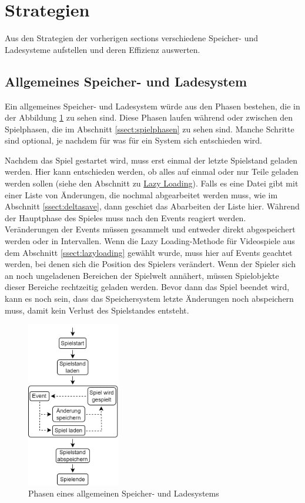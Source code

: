 \section{Strategien}
Aus den Strategien der vorherigen sections verschiedene Speicher- und Ladesysteme aufstellen und deren Effizienz auswerten. 

\subsection{Allgemeines Speicher- und Ladesystem}
Ein allgemeines Speicher- und Ladesystem würde aus den Phasen bestehen, die in der Abbildung \ref{fig:speicherphasen} zu sehen sind. Diese Phasen laufen während oder zwischen den Spielphasen, die im Abschnitt \ref{ssect:spielphasen} zu sehen sind. Manche Schritte sind optional, je nachdem für was für ein System sich entschieden wird.

Nachdem das Spiel gestartet wird, muss erst einmal der letzte Spielstand geladen werden. Hier kann entschieden werden, ob alles auf einmal oder nur Teile geladen werden sollen (siehe den Abschnitt zu \hyperref[ssect:lazyloading]{Lazy Loading}). Falls es eine Datei gibt mit einer Liste von Änderungen, die nochmal abgearbeitet werden muss, wie im Abschnitt \ref{ssect:deltasave}, dann geschiet das Abarbeiten der Liste hier. Während der Hauptphase des Spieles muss nach den Events reagiert werden. Veränderungen der Events müssen gesammelt und entweder direkt abgespeichert werden oder in Intervallen. Wenn die Lazy Loading-Methode für Videospiele aus dem Abschnitt \ref{ssect:lazyloading} gewählt wurde, muss hier auf Events geachtet werden, bei denen sich die Position des Spielers verändert. Wenn der Spieler sich an noch ungeladenen Bereichen der Spielwelt annähert, müssen Spielobjekte dieser Bereiche rechtzeitig geladen werden. Bevor dann das Spiel beendet wird, kann es noch sein, dass das Speichersystem letzte Änderungen noch abspeichern muss, damit kein Verlust des Spielstandes entsteht.

\begin{figure}[htp]
    \centering
    \includegraphics[width=0.36\textwidth]{images/Speichersystem.png}
    \caption{Phasen eines allgemeinen Speicher- und Ladesystems}
    \label{fig:speicherphasen}
\end{figure}

